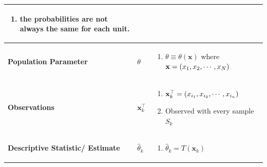 \begin{customArrayStretch}{1.3}
\begin{longtable}{>{\RaggedRight\arraybackslash}p{4cm} >{\centering\arraybackslash}p{0.5cm} p{10.5cm}}
\begin{minipage}{10.3cm}
\begin{enumerate}[itemsep=0.2cm]
            \item the probabilities are \textbf{not} always the same for each unit.
            \hfill \cite{statistics/book/Statistics-for-Data-Scientists/Maurits-Kaptein}

        \end{enumerate}
        \vspace{0.15cm}
    \end{minipage} 
    \\ \hline


\textbf{Population Parameter} &
    $\theta$ &
    \begin{minipage}{10.3cm}
        \vspace{0.15cm}
        \begin{enumerate}[itemsep=0.2cm]
            \item $\theta \equiv \theta(\mathbf{x})$ where $\mathbf{x} = \left(x_1, x_2, \cdots, x_N\right)$
            \hfill \cite{statistics/book/Statistics-for-Data-Scientists/Maurits-Kaptein}
            
        \end{enumerate}
        \vspace{0.15cm}
    \end{minipage} 
    \\ \hline


\textbf{Observations} &
    $\mathbf{x}_k^\top$ &
    \begin{minipage}{10.3cm}
        \vspace{0.15cm}
        \begin{enumerate}[itemsep=0.2cm]
            \item $\mathbf{x}_k^\top = \left(x_{i_1}, x_{i_2}, \cdots, x_{i_n}\right)$
            \hfill \cite{statistics/book/Statistics-for-Data-Scientists/Maurits-Kaptein}

            \item Observed with every sample $S_k$
            \hfill \cite{statistics/book/Statistics-for-Data-Scientists/Maurits-Kaptein}
        \end{enumerate}
        \vspace{0.15cm}
    \end{minipage} 
    \\ \hline

\textbf{Descriptive Statistic/ Estimate} &
    $\hat{\theta}_k$ &
    \begin{minipage}{10.3cm}
        \vspace{0.15cm}
        \begin{enumerate}[itemsep=0.2cm]
            \item $\hat{\theta}_k = T(\mathbf{x}_k)$
            \hfill \cite{statistics/book/Statistics-for-Data-Scientists/Maurits-Kaptein}


\end{enumerate}
\end{minipage}
\end{longtable}
\end{customArrayStretch}
